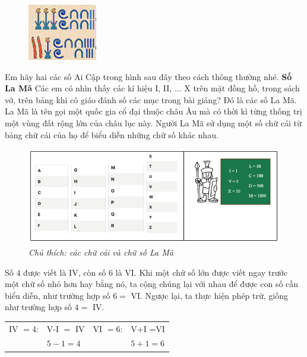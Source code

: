 	\vskip 0.1cm 
	
	\begin{figure}
		\vspace*{-10pt}
		\centering
		\captionsetup{labelformat=empty, justification=centering}
		\includegraphics[scale=1]{13}
		\vspace*{-10pt}
	\end{figure}                          
	Em hãy hai các số Ai Cập trong hình sau đây theo cách thông thường nhé.    
	\vskip 0.1cm
	\textbf{Số La Mã}
	\vskip 0.1cm
	Các em có nhìn thấy các kí hiệu I, II, ... X trên mặt đồng hồ, trong sách vở, trên bảng khi cô giáo đánh số các mục trong bài giảng? Đó là các số La Mã. La Mã là tên gọi một quốc gia cổ đại thuộc châu Âu mà có thời kì từng thống trị một vùng đất rộng lớn của châu lục này. Người La Mã sử dụng một số chữ cái từ bảng chữ cái của họ để biểu diễn những chữ số khác nhau.
	\begin{figure}[H]
		\centering
		\vspace*{-10pt}
		\captionsetup{labelformat= empty, justification=centering}
		\includegraphics[width=1\linewidth]{111}
		\caption{\small\textit{Chú thích: các chữ cái và chữ số La Mã}}
		\vspace*{-10pt}
	\end{figure}
	Số $4$ được viết là IV, còn số $6$ là VI. Khi một chữ số lớn được viết ngay trước  một chữ số nhỏ hơn hay bằng nó, ta cộng chúng lại với nhau để được con số cần biểu diễn, như trường hợp số $6=$ VI. Ngược lại, ta thực hiện phép trừ, giống như trường hợp số $4=$ IV.
	\begin{table}[H]
		\vspace*{-5pt}
		\centering
			\begin{tabular}{|l l|l l|}
			\hline
			IV $=4$:&    V-I $=$ IV & VI $=6$:&    V+I =VI\\
			&$5-1=4$ & &$5+1=6$\\
			\hline
		\end{tabular}
		\vspace*{-10pt}
	\end{table}
